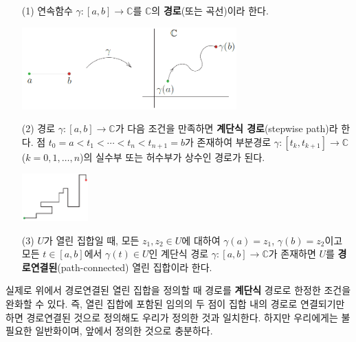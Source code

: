 \begin{saltdefinition}{}{} \label{def-1-1}
\begin{itemize}
\item[(1)] 연속함수 $\gamma:[a,b] \to \mathbb C$를 $\mathbb C$의 
\textbf{경로}(또는 곡선)이라 한다.
\begin{center}
\includegraphics[width=0.65\textwidth]{./SaltChapter/figs/fig-1-0-2}
\end{center}
\item[(2)] 경로 $\gamma:[a,b] \to \mathbb C$가 다음 조건을 만족하면 
\textbf{계단식 경로}(stepwise path)라 한다.
점 $t_0 = a < t_1 < \cdots < t_n < t_{n+1} = b$가 존재하여
부분경로 $\gamma: [t_k, t_{k+1}] \to \mathbb C$ ($k=0,1,\ldots, n$)의
실수부 또는 허수부가 상수인 경로가 된다.
\begin{center}
\includegraphics[width=0.2\textwidth]{./SaltChapter/figs/fig-1-0-3}
\end{center}
\item[(3)] $U$가 열린 집합일 때,  모든 $z_1, z_2\in U$에 대하여
$\gamma(a)=z_1$, $\gamma(b)=z_2$이고 모든 $t\in[a,b]$에서 $\gamma(t)\in U$인
계단식 경로 $\gamma: [a,b] \to \mathbb C$가 존재하면
$U$를 \textbf{경로연결된}(path-connected) 열린 집합이라 한다.
\end{itemize}
\end{saltdefinition}

실제로 위에서 경로연결된 열린 집합을 정의할 때 경로를 {\bf 계단식} 경로로 한정한 조건을 
완화할 수 있다. 즉, 열린 집합에 포함된 임의의 두 점이 집합 내의 경로로 연결되기만 하면
경로연결된 것으로 정의해도
우리가 정의한 것과 일치한다.
하지만 우리에게는 불필요한 일반화이며, 앞에서 정의한 것으로 충분하다.

